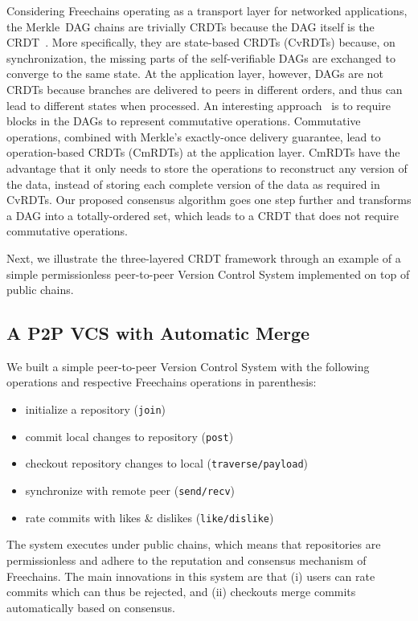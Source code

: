 \documentclass[10pt,journal,compsoc]{IEEEtran}
\newcommand{\FC}       {Freechains\xspace}
\begin{document}
Considering \FC operating as a transport layer for networked applications, the
Merkle~DAG chains are trivially CRDTs because the DAG itself is the
CRDT~\cite{p2p.merkle-crdts}.
More specifically, they are state-based CRDTs (CvRDTs) because, on
synchronization, the missing parts of the self-verifiable DAGs are exchanged to
converge to the same state.
%
At the application layer, however, DAGs are not CRDTs because branches are
delivered to peers in different orders, and thus can lead to different states
when processed.
An interesting approach~\cite{p2p.merkle-crdts} is to require blocks in the
DAGs to represent commutative operations.
Commutative operations, combined with Merkle's exactly-once delivery guarantee,
lead to operation-based CRDTs (CmRDTs) at the application layer.
CmRDTs have the advantage that it only needs to store the operations to
reconstruct any version of the data, instead of storing each complete version
of the data as required in CvRDTs.
%
Our proposed consensus algorithm goes one step further and transforms a DAG
into a totally-ordered set, which leads to a CRDT that does not require
commutative operations.

Next, we illustrate the three-layered CRDT framework through an example of a
simple permissionless peer-to-peer Version Control System implemented on top
of public chains.

\subsection{A P2P VCS with Automatic Merge}

We built a simple peer-to-peer Version Control System with the following
operations and respective \FC operations in parenthesis:
%
\begin{itemize}
    \setlength{\itemindent}{-8pt}
    \item initialize a repository (\texttt{join})
    \item commit local changes to repository (\texttt{post})
    \item checkout repository changes to local (\texttt{traverse/payload})
    \item synchronize with remote peer (\texttt{send/recv})
    \item rate commits with likes \& dislikes (\texttt{like/dislike})
\end{itemize}
%
The system executes under public chains, which means that repositories are
permissionless and adhere to the reputation and consensus mechanism of \FC.
The main innovations in this system are that
    (i)  users can rate commits which can thus be rejected,  and
    (ii) checkouts merge commits automatically based on consensus.
\end{document}
